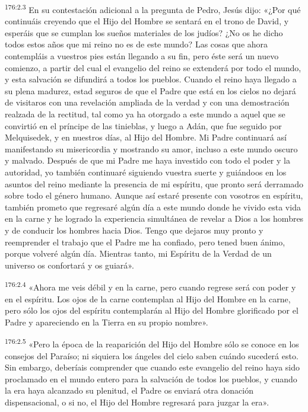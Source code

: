 \par 
\textsuperscript{176:2.3} En su contestación adicional a la pregunta de Pedro, Jesús dijo: «¿Por qué continuáis creyendo que el Hijo del Hombre se sentará en el trono de David, y esperáis que se cumplan los sueños materiales de los judíos? ¿No os he dicho todos estos años que mi reino no es de este mundo? Las cosas que ahora contempláis a vuestros pies están llegando a su fin, pero éste será un nuevo comienzo, a partir del cual el evangelio del reino se extenderá por todo el mundo, y esta salvación se difundirá a todos los pueblos. Cuando el reino haya llegado a su plena madurez, estad seguros de que el Padre que está en los cielos no dejará de visitaros con una revelación ampliada de la verdad y con una demostración realzada de la rectitud, tal como ya ha otorgado a este mundo a aquel que se convirtió en el príncipe de las tinieblas, y luego a Adán, que fue seguido por Melquisedek, y en nuestros días, al Hijo del Hombre. Mi Padre continuará así manifestando su misericordia y mostrando su amor, incluso a este mundo oscuro y malvado. Después de que mi Padre me haya investido con todo el poder y la autoridad, yo también continuaré siguiendo vuestra suerte y guiándoos en los asuntos del reino mediante la presencia de mi espíritu, que pronto será derramado sobre todo el género humano. Aunque así estaré presente con vosotros en espíritu, también prometo que regresaré algún día a este mundo donde he vivido esta vida en la carne y he logrado la experiencia simultánea de revelar a Dios a los hombres y de conducir los hombres hacia Dios. Tengo que dejaros muy pronto y reemprender el trabajo que el Padre me ha confiado, pero tened buen ánimo, porque volveré algún día. Mientras tanto, mi Espíritu de la Verdad de un universo os confortará y os guiará».

\par 
\textsuperscript{176:2.4} «Ahora me veis débil y en la carne, pero cuando regrese será con poder y en el espíritu. Los ojos de la carne contemplan al Hijo del Hombre en la carne, pero sólo los ojos del espíritu contemplarán al Hijo del Hombre glorificado por el Padre y apareciendo en la Tierra en su propio nombre».

\par 
\textsuperscript{176:2.5} «Pero la época de la reaparición del Hijo del Hombre sólo se conoce en los consejos del Paraíso; ni siquiera los ángeles del cielo saben cuándo sucederá esto. Sin embargo, deberíais comprender que cuando este evangelio del reino haya sido proclamado en el mundo entero para la salvación de todos los pueblos, y cuando la era haya alcanzado su plenitud, el Padre os enviará otra donación dispensacional, o si no, el Hijo del Hombre regresará para juzgar la era».

